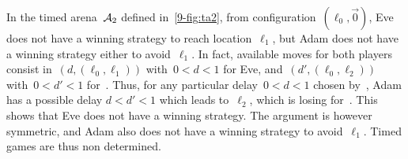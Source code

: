 \begin{example}
  In the timed arena~$\mathcal{A}_2$ defined in~\cref{9-fig:ta2}, from configuration~$(\ell_0,\vec{0})$, Eve does not have a winning strategy to reach location~$\ell_1$, but Adam does not have a winning strategy either to avoid~$\ell_1$.
  In fact, available moves for both players consist in~$(d,(\ell_0,\ell_1))$ with~$0< d<1$ for Eve, and~$(d',(\ell_0,\ell_2))$ with~$0< d' < 1$ for~\Adam.
  Thus, for any particular delay~$0<d<1$ chosen by~\Eve, Adam has a possible delay $d<d'<1$ which leads to~$\ell_2$, which is losing for~\Eve.
  This shows that Eve does not have a winning strategy.
  The argument is however symmetric, and Adam also does not have a winning strategy to avoid~$\ell_1$.
  Timed games are thus non determined.
\end{example}













